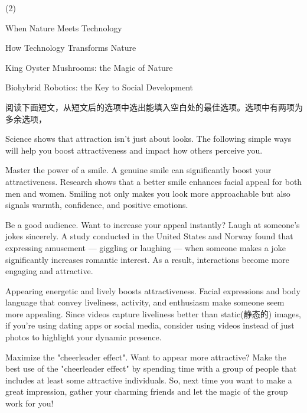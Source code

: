 \documentclass{英语试卷}
\begin{document}
\begin{choices}(2)
  \item When Nature Meets Technology
  \item How Technology Transforms Nature
  \item King Oyster Mushrooms: the Magic of Nature
  \item Biohybrid Robotics: the Key to Social Development
\end{choices}
\par 阅读下面短文，从短文后的选项中选出能填入空白处的最佳选项。选项中有两项为多余选项，\par
\par Science shows that attraction isn't just about looks.  The following simple ways will help you boost attractiveness and impact how others perceive you.\par
\par Master the power of a smile. A genuine smile can significantly boost your attractiveness. Research shows that a better smile enhances facial appeal for both men and women. Smiling not only makes you look more approachable but also signals warmth, confidence, and positive emotions. \par
\par Be a good audience. Want to increase your appeal instantly? Laugh at someone's jokes sincerely. A study conducted in the United States and Norway found that expressing amusement — giggling or laughing — when someone makes a joke significantly increases romantic interest.  As a result, interactions become more engaging and attractive.\par
\par {}Appearing energetic and lively boosts attractiveness. Facial expressions and body language that convey liveliness, activity, and enthusiasm make someone seem more appealing. Since videos capture liveliness better than static(静态的) images, if you're using dating apps or social media, consider using videos instead of just photos to highlight your dynamic presence.\par
\par Maximize the "cheerleader effect". Want to appear more attractive? Make the best use of the "cheerleader effect" by spending time with a group of people that includes at least some attractive individuals.  So, next time you want to make a great impression, gather your charming friends and let the magic of the group work for you!\par
\end{document}

